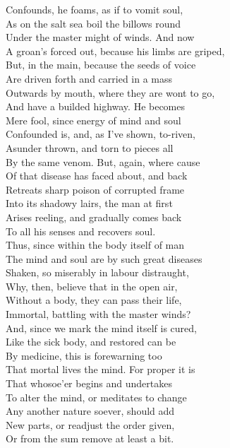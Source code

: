 Confounds, he foams, as if to vomit soul,\\
As on the salt sea boil the billows round\\
Under the master might of winds. And now\\
A groan's forced out, because his limbs are griped,\\
But, in the main, because the seeds of voice\\
Are driven forth and carried in a mass\\
Outwards by mouth, where they are wont to go,\\
And have a builded highway. He becomes\\
Mere fool, since energy of mind and soul\\
Confounded is, and, as I've shown, to-riven,\\
Asunder thrown, and torn to pieces all\\
By the same venom. But, again, where cause\\
Of that disease has faced about, and back\\
Retreats sharp poison of corrupted frame\\
Into its shadowy lairs, the man at first\\
Arises reeling, and gradually comes back\\
To all his senses and recovers soul.\\
Thus, since within the body itself of man\\
The mind and soul are by such great diseases\\
Shaken, so miserably in labour distraught,\\
Why, then, believe that in the open air,\\
Without a body, they can pass their life,\\
Immortal, battling with the master winds?\\
And, since we mark the mind itself is cured,\\
Like the sick body, and restored can be\\
By medicine, this is forewarning too\\
That mortal lives the mind. For proper it is\\
That whosoe'er begins and undertakes\\
To alter the mind, or meditates to change\\
Any another nature soever, should add\\
New parts, or readjust the order given,\\
Or from the sum remove at least a bit.\\
